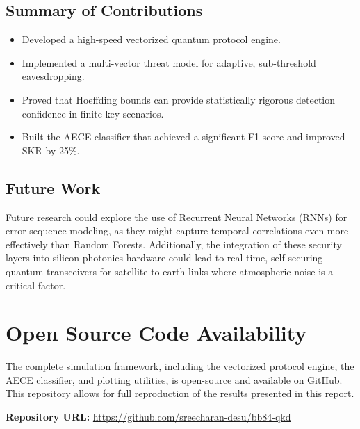 \documentclass[journal,onecolumn,12pt,draftclsnofoot]{IEEEtran}
\begin{document}
\subsection{Summary of Contributions}
\begin{itemize}
    \item Developed a high-speed vectorized quantum protocol engine.
    \item Implemented a multi-vector threat model for adaptive, sub-threshold eavesdropping.
    \item Proved that Hoeffding bounds can provide statistically rigorous detection confidence in finite-key scenarios.
    \item Built the AECE classifier that achieved a significant F1-score and improved SKR by 25\%.
\end{itemize}

\subsection{Future Work}
Future research could explore the use of Recurrent Neural Networks (RNNs) for error sequence modeling, as they might capture temporal correlations even more effectively than Random Forests. Additionally, the integration of these security layers into silicon photonics hardware could lead to real-time, self-securing quantum transceivers for satellite-to-earth links where atmospheric noise is a critical factor.

\newpage

\section*{Open Source Code Availability}
The complete simulation framework, including the vectorized protocol engine, the AECE classifier, and plotting utilities, is open-source and available on GitHub. This repository allows for full reproduction of the results presented in this report.
\begin{center}
    \textbf{Repository URL:} \href{https://github.com/sreecharan-desu/bb84-qkd}{https://github.com/sreecharan-desu/bb84-qkd}
\end{center}
\end{document}
